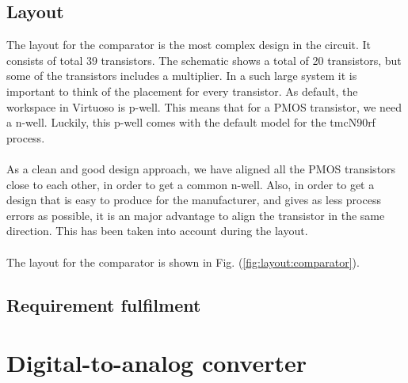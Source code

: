 \documentclass[english, 12pt, a4paper]{ifimaster}
\begin{document}
\subsection{Layout}
The layout for the comparator is the most complex design in the circuit. It consists 
of total 39 transistors. The schematic shows a total of 20 transistors, but some of the
transistors includes a multiplier. In a such large system it is important to think 
of the placement for every transistor. As default, the workspace in Virtuoso is p-well. 
This means that for a PMOS transistor, we need a n-well. Luckily, this p-well comes 
with the default model for the tmcN90rf process. \\
\\
As a clean and good design approach, we have aligned all the PMOS transistors close 
to each other, in order to get a common n-well. Also, in order to get a design that 
is easy to produce for the manufacturer, and gives as less process errors as 
possible, it is an major advantage to align the transistor in the same direction. 
This has been taken into account during the layout.\\
\\
The layout for the comparator is shown in Fig. (\ref{fig:layout:comparator}). 
% 


\subsection{Requirement fulfilment}


\section{Digital-to-analog converter}
\end{document}
